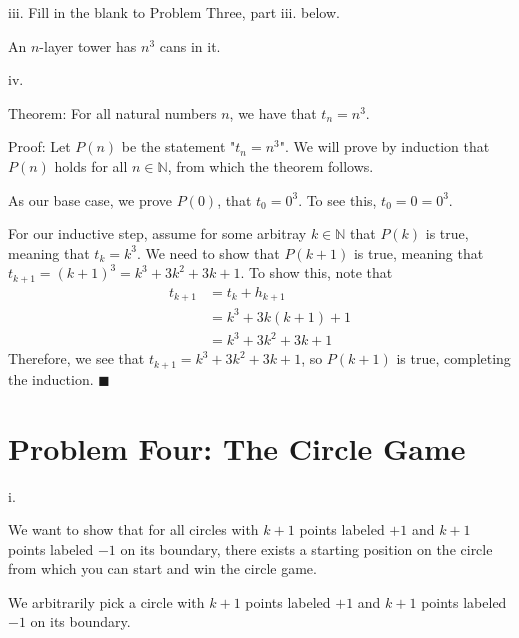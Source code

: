 \documentclass{article}
\renewcommand{\(}{\left(}
\renewcommand{\)}{\right)}
\renewcommand\qedsymbol{$\blacksquare$}
\theoremstyle{plain}
\theoremstyle{plain}
\theoremstyle{definition}
\begin{document}
    iii. Fill in the blank to Problem Three, part iii. below.
    \begin{shaded}
    An $n$-layer tower has $n^{3}$ cans in it.
    \end{shaded}
    
    iv.
    \begin{shaded}
        Theorem: For all natural numbers $n$, we have that $t_{n}=n^{3}$.

        \vspace{4mm}

        Proof: Let $P(n)$ be the statement "$t_{n}=n^{3}$". We will prove by induction that $P(n)$ holds for all $n\in\mathbb{N}$, from which the theorem follows.

        \vspace{4mm}

        As our base case, we prove $P(0)$, that $t_{0}=0^{3}$. To see this, $t_{0}=0=0^{3}$.

        \vspace{4mm}

        For our inductive step, assume for some arbitray $k\in\mathbb{N}$ that $P(k)$ is true, meaning that $t_{k}=k^{3}$. We need to show that $P(k+1)$ is true, meaning that $t_{k+1}=(k+1)^{3} = k^{3}+3k^{2}+3k+1$. To show this, note that
        $$
            \begin{aligned}
                t_{k+1} &= t_{k} + h_{k+1} \\
                        &= k^{3} + 3k(k+1) + 1 \\
                        &= k^{3} + 3k^{2} + 3k + 1
            \end{aligned}
        $$
        Therefore, we see that $t_{k+1}=k^{3}+3k^{2}+3k+1$, so $P(k+1)$ is true, completing the induction.
        \qedsymbol
    \end{shaded}

\newpage

\section*{Problem Four: The Circle Game}
    i.
    \begin{shaded}
        We want to show that for all circles with $k+1$ points labeled $+1$ and $k+1$ points labeled $-1$ on its boundary, there exists a starting position on the circle from which you can start and win the circle game.

        \vspace{4mm}

        We arbitrarily pick a circle with $k+1$ points labeled $+1$ and $k+1$ points labeled $-1$ on its boundary.
    \end{shaded}
    
\end{document}
